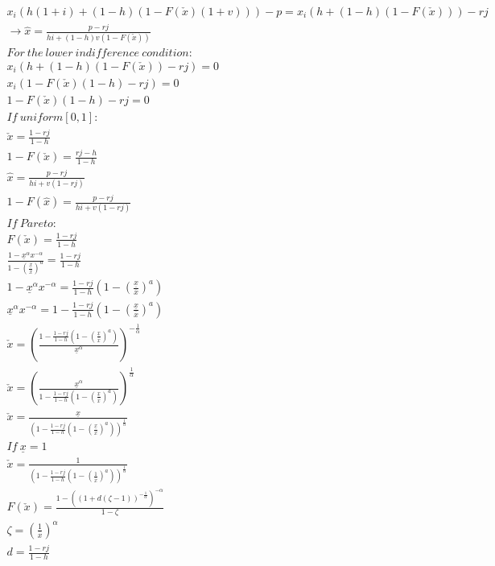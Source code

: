 \documentclass{article}
\begin{document}
\begin{align*}
x_i(h(1+i)+(1-h)(1-F(\check{x})(1+v)))-p = x_i(h+(1-h)(1-F(\check{x})))-rj \\
\rightarrow 
\hat{x} = \frac{p-rj}{hi+(1-h)v(1-F(\check{x}))} \\
For~the~lower~indifference~condition:\\
x_i(h+(1-h)(1-F(\check{x}))-rj)=0 \\
x_i(1-F(\check{x})(1-h)-rj)=0 \\
1-F(\check{x})(1-h)-rj=0 \\
If~uniform [0,1]: \\
\check{x}= \frac{1-rj}{1-h} \\
1-F(\check{x}) = \frac{rj-h}{1-h} \\
\hat{x} = \frac{p-rj}{hi+v(1-rj)} \\
1-F(\hat{x})=\frac{p-rj}{hi+v(1-rj)} \\
If~Pareto:\\ 
F(\check{x})= \frac{1-rj}{1-h} \\
\frac{1-\underline{x}^\alpha x^{-\alpha}}{1-(\frac{\underline{x}}{\overline{x}})^a}= \frac{1-rj}{1-h} \\
1-\underline{x}^\alpha x^{-\alpha} = \frac{1-rj}{1-h}\left(1-\left(\frac{\underline{x}}{\overline{x}}\right)^a \right) \\
\underline{x}^\alpha x^{-\alpha} =1- \frac{1-rj}{1-h}\left(1-\left(\frac{\underline{x}}{\overline{x}}\right)^a \right) \\
\check{x}=\left(\frac{1- \frac{1-rj}{1-h}\left(1-\left(\frac{\underline{x}}{\overline{x}}\right)^a \right)}{\underline{x}^\alpha}\right)^{-\frac{1}{\alpha}} \\
\check{x}=\left(\frac{\underline{x}^\alpha}{1- \frac{1-rj}{1-h}\left(1-\left(\frac{\underline{x}}{\overline{x}}\right)^a \right)}\right)^{\frac{1}{\alpha}} \\
\check{x}=\frac{\underline{x}}{\left(1- \frac{1-rj}{1-h}\left(1-\left(\frac{\underline{x}}{\overline{x}}\right)^a \right)\right)^\frac{1}{\alpha}} \\
If~\underline{x}=1 \\
\check{x}=\frac{1}{\left(1- \frac{1-rj}{1-h}\left(1-\left(\frac{1}{\overline{x}}\right)^a \right)\right)^\frac{1}{\alpha}} \\
F(\check{x}) = \frac{1-((1+d(\zeta-1))^{-\frac{1}{\alpha}})^{-\alpha}}{1-\zeta} \\
\zeta = (\frac{1}{\overline{x}})^{\alpha} \\
d = \frac{1-rj}{1-h} \\
\end{align*}
\end{document}
